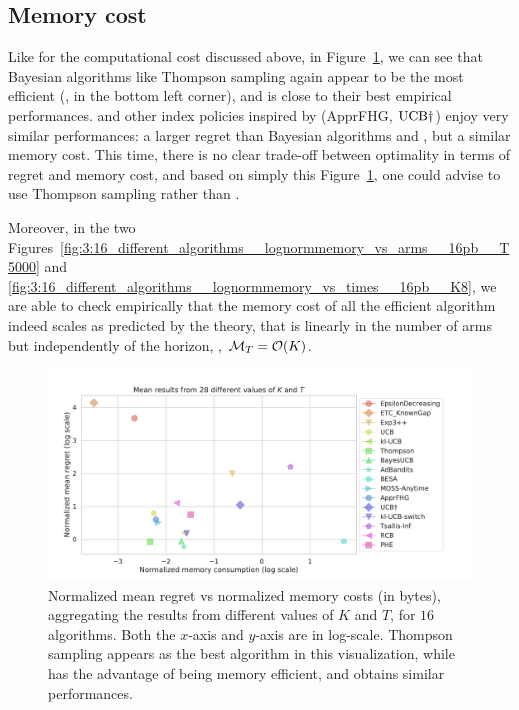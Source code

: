 \subsection{Memory cost}

Like for the computational cost discussed above,
in Figure~\ref{fig:3:16_different_algorithms__lognormregret_vs_logmemory__28pb}, we can see that Bayesian algorithms like Thompson sampling again appear to be the most efficient (\ie, in the bottom left corner), and \klUCB{} is close to their best empirical performances.
\UCB{} and other index policies inspired by \UCB{} (ApprFHG, $\mathrm{UCB}\dagger$) enjoy very similar performances: a larger regret than Bayesian algorithms and \klUCB, but a similar memory cost.
%
This time, there is no clear trade-off between optimality in terms of regret and memory cost, and based on simply this Figure~\ref{fig:3:16_different_algorithms__lognormregret_vs_logmemory__28pb}, one could advise to use Thompson sampling rather than \klUCB.

Moreover, in the two Figures~\ref{fig:3:16_different_algorithms__lognormmemory_vs_arms__16pb__T5000} and
\ref{fig:3:16_different_algorithms__lognormmemory_vs_times__16pb__K8},
we are able to check empirically that the memory cost of all the efficient algorithm indeed scales as predicted by the theory, that is
linearly in the number of arms but independently of the horizon, \ie, $\mathcal{M}_T = \mathop{}\mathopen{}\mathcal{O}\mathopen{}\left(K\right)$.

\begin{figure}[h!]  %
	\includegraphics[width=1.10\linewidth]{16_different_algorithms__lognormregret_vs_logmemory__28pb.pdf}
	\caption[Normalized mean regret vs normalized memory costs (in bytes).]{
        Normalized mean regret vs normalized memory costs (in bytes),
        aggregating the results from different values of $K$ and $T$, for $16$ algorithms.
        Both the $x$-axis and $y$-axis are in log-scale.
        Thompson sampling appears as the best algorithm in this visualization, while \UCB{} has the advantage of being memory efficient, and \klUCB{} obtains similar performances.
	}
	\label{fig:3:16_different_algorithms__lognormregret_vs_logmemory__28pb}
\end{figure}


